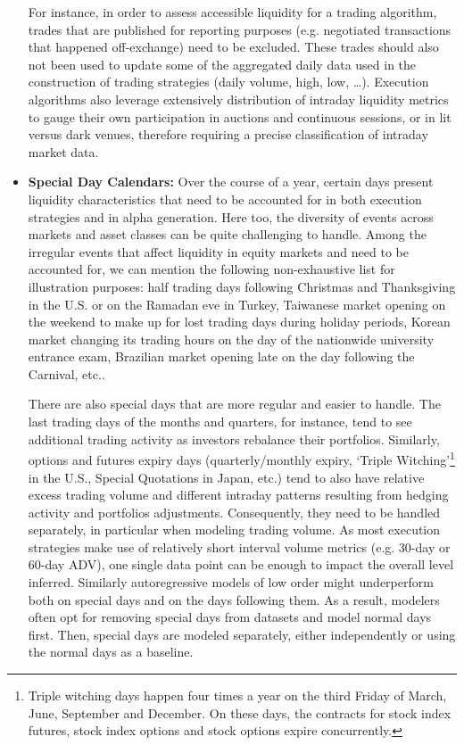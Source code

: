 \begin{itemize}
For instance, in order to assess accessible liquidity for a trading algorithm, trades that are published for reporting purposes (e.g. negotiated transactions that happened off-exchange) need to be excluded. These trades should also not been used to update some of the aggregated daily data used in the construction of trading strategies (daily volume, high, low, \dots). Execution algorithms also leverage extensively distribution of intraday liquidity metrics to gauge their own participation in auctions and continuous sessions, or in lit versus dark venues, therefore requiring a precise classification of intraday market data. 


\item \textbf{Special Day Calendars:} Over the course of a year, certain days present liquidity characteristics that need to be accounted for in both execution strategies and in alpha generation. Here too, the diversity of events across markets and asset classes can be quite challenging to handle. Among the irregular events that affect liquidity in equity markets and need to be accounted for, we can mention the following non-exhaustive list for illustration purposes: half trading days following Christmas and Thanksgiving in the U.S. or on the Ramadan eve in Turkey, Taiwanese market opening on the weekend to make up for lost trading days during holiday periods, Korean market changing its trading hours on the day of the nationwide university entrance exam, Brazilian market opening late on the day following the Carnival, etc..

There are also special days that are more regular and easier to handle. The last trading days of the months and quarters, for instance, tend to see additional trading activity as investors rebalance their portfolios. Similarly, options and futures expiry days (quarterly/monthly expiry, `Triple Witching'\footnote{Triple witching days happen four times a year on the third Friday of March, June, September and December. On these days, the contracts for stock index futures, stock index options and stock options expire concurrently.} in the U.S., Special Quotations in Japan, etc.) tend to also have relative excess trading volume and different intraday patterns resulting from hedging activity and portfolios adjustments. Consequently, they need to be handled separately, in particular when modeling trading volume. As most execution strategies make use of relatively short interval volume metrics (e.g. 30-day or 60-day ADV), one single data point can be enough to impact the overall level inferred. Similarly autoregressive models of low order might underperform both on special days and on the days following them. As a result, modelers often opt for removing special days from datasets and model normal days first. Then, special days are modeled separately, either independently or using the normal days as a baseline. 


\end{itemize}
